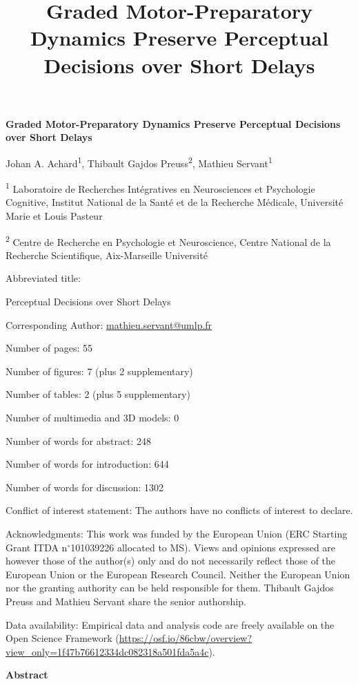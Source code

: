 \documentclass[a4paper,11pt]{article}
\title{Graded Motor-Preparatory Dynamics Preserve Perceptual Decisions over Short Delays}
\date{}
\theoremstyle{definition}
\newcommand{\1}{\mathbbm{1}}
\begin{document}
\linenumbers
\textbf{Graded Motor-Preparatory Dynamics Preserve Perceptual Decisions over Short Delays}

Johan A. Achard\textsuperscript{1}, Thibault Gajdos Preuss\textsuperscript{2}, Mathieu Servant\textsuperscript{1}

\textsuperscript{1} Laboratoire de Recherches Int\'egratives en Neurosciences et Psychologie Cognitive, Institut National de la Sant\'e et de la Recherche M\'edicale, Universit\'e Marie et Louis Pasteur

\textsuperscript{2} Centre de Recherche en Psychologie et Neuroscience, Centre National de la Recherche Scientifique, Aix-Marseille Universit\'e

Abbreviated title:

Perceptual Decisions over Short Delays

Corresponding Author: \url{mathieu.servant@umlp.fr}

Number of pages: 55

Number of figures: 7 (plus 2 supplementary)

Number of tables: 2 (plus 5 supplementary)

Number of multimedia and 3D models: 0

Number of words for abstract: 248

Number of words for introduction: 644

Number of words for discussion: 1302

Conflict of interest statement: The authors have no conflicts of interest to declare.

Acknowledgments: This work was funded by the European Union (ERC Starting Grant ITDA n$^{\circ}$101039226 allocated to MS). Views and opinions expressed are however those of the author(s) only and do not necessarily reflect those of the European Union or the European Research Council. Neither the European Union nor the granting authority can be held responsible for them.  Thibault  Gajdos  Preuss  and  Mathieu  Servant  share  the  senior authorship.

Data availability: Empirical data and analysis code are freely available on the Open Science Framework (\url{https://osf.io/86cbw/overview?view\_only=1f47b76612334dc082318a501fda5a4c}).


\textbf{Abstract}
\end{document}
